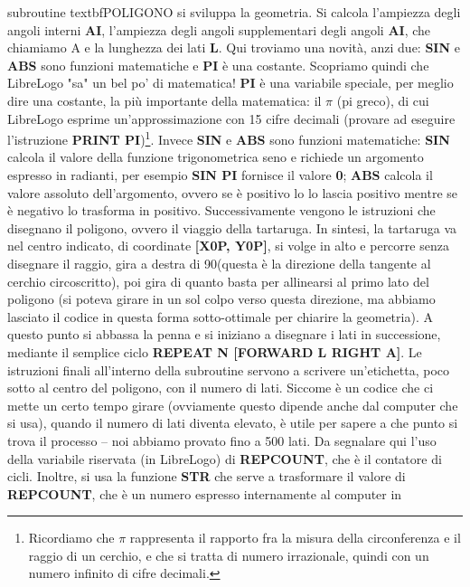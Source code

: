  subroutine textbf{POLIGONO} si sviluppa la geometria. Si calcola l'ampiezza
 degli angoli interni \textbf{AI}, l'ampiezza degli angoli supplementari degli
 angoli \textbf{AI}, che chiamiamo A e la lunghezza dei lati \textbf{L}. Qui
 troviamo una novità, anzi due: \textbf{SIN} e \textbf{ABS} sono funzioni
 matematiche e \textbf{PI} è una costante. Scopriamo quindi che LibreLogo "sa"
 un bel po' di matematica! \textbf{PI} è una variabile speciale, per meglio
 dire una costante, la più importante della matematica: il $\pi$ (pi greco), di cui
 LibreLogo esprime un'approssimazione con 15 cifre decimali (provare ad
 eseguire l'istruzione \textbf{PRINT PI})\footnote{Ricordiamo che  $\pi$
 rappresenta il rapporto fra la misura della circonferenza e il raggio di un
 cerchio, e che si tratta di numero irrazionale, quindi con un numero infinito
 di cifre decimali.}. Invece \textbf{SIN} e \textbf{ABS}
 sono funzioni matematiche: \textbf{SIN} calcola il valore della funzione
 trigonometrica seno e richiede un argomento espresso in radianti, per esempio
 \textbf{SIN PI} fornisce il valore \textbf{0}; \textbf{ABS} calcola il valore
 assoluto dell'argomento, ovvero se è positivo lo lo lascia positivo mentre se
 è negativo lo trasforma in positivo. Successivamente vengono le istruzioni che
 disegnano il poligono, ovvero il viaggio della tartaruga. In sintesi, la
 tartaruga va nel centro indicato, di coordinate \textbf{[X0P, Y0P]}, si volge
 in alto e percorre senza disegnare il raggio, gira a destra di 90\degree (questa è
 la direzione della tangente al cerchio circoscritto), poi gira di quanto basta
 per allinearsi al primo lato del  poligono (si poteva girare in un sol colpo
 verso questa direzione, ma abbiamo lasciato il codice in questa forma
 sotto-ottimale per chiarire la geometria). A questo punto si abbassa la penna
 e si iniziano a disegnare i lati in successione, mediante il semplice ciclo
 \textbf{REPEAT N [FORWARD L RIGHT A]}. Le istruzioni finali all'interno della
 subroutine servono a scrivere un'etichetta, poco sotto al centro del poligono,
 con il numero di lati. Siccome è un codice che ci mette un certo tempo girare
 (ovviamente questo dipende anche dal computer che si usa), quando il numero di
 lati diventa elevato, è utile per sapere a che punto si trova il processo –
 noi abbiamo provato fino a 500 lati. Da segnalare qui l'uso della variabile
 riservata (in LibreLogo) di \textbf{REPCOUNT}, che è il contatore di cicli.
 Inoltre, si usa la funzione \textbf{STR} che serve a trasformare il valore di
 \textbf{REPCOUNT}, che è un numero espresso internamente al computer in
